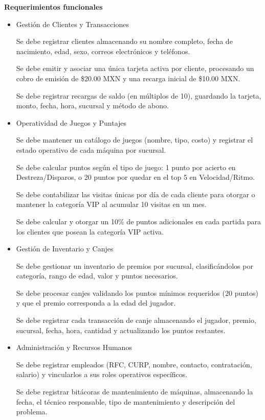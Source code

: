\item \textbf{Requerimientos funcionales}

\begin{itemize}
        \item Gestión de Clientes y Transacciones

Se debe registrar clientes almacenando su nombre completo, fecha de nacimiento, edad, sexo, correos electrónicos y teléfonos.

Se debe emitir y asociar una única tarjeta activa por cliente, procesando un cobro de emisión de \$20.00 MXN y una recarga inicial de \$10.00 MXN.

Se debe registrar recargas de saldo (en múltiplos de 10), guardando la tarjeta, monto, fecha, hora, sucursal y método de abono.

        \item Operatividad de Juegos y Puntajes
        
Se debe mantener un catálogo de juegos (nombre, tipo, costo) y registrar el estado operativo de cada máquina por sucursal.

Se debe calcular puntos según el tipo de juego: 1 punto por acierto en Destreza/Disparos, o 20 puntos por quedar en el top 5 en Velocidad/Ritmo.

Se debe contabilizar las visitas únicas por día de cada cliente para otorgar o mantener la categoría VIP al acumular 10 visitas en un mes.

Se debe calcular y otorgar un 10\% de puntos adicionales en cada partida para los clientes que posean la categoría VIP activa.

        \item Gestión de Inventario y Canjes
        
Se debe gestionar un inventario de premios por sucursal, clasificándolos por categoría, rango de edad, valor y puntos necesarios.

Se debe procesar canjes validando los puntos mínimos requeridos (20 puntos) y que el premio corresponda a la edad del jugador.

Se debe registrar cada transacción de canje almacenando el jugador, premio, sucursal, fecha, hora, cantidad y actualizando los puntos restantes.

        \item Administración y Recursos Humanos
        
Se debe registrar empleados (RFC, CURP, nombre, contacto, contratación, salario) y vincularlos a sus roles operativos específicos.

Se debe registrar bitácoras de mantenimiento de máquinas, almacenando la fecha, el técnico responsable, tipo de mantenimiento y descripción del problema.

\end{itemize}
